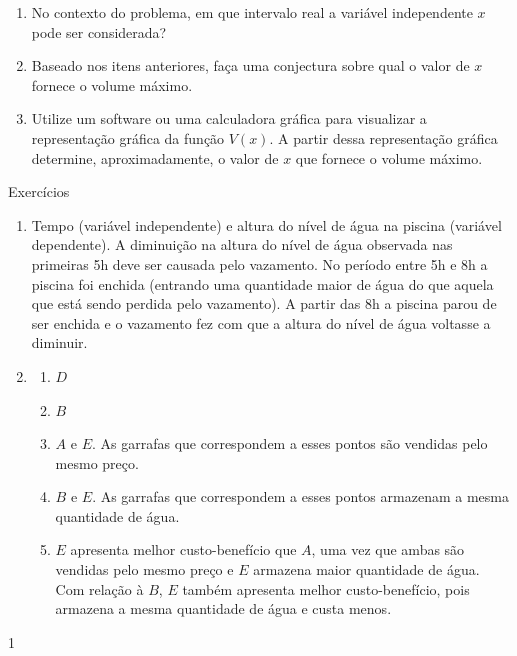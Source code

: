 \begin{project}
\begin{enumerate}
\item {} 
No contexto do problema, em que intervalo real a variável independente \(x\) pode ser considerada?

\item {} 
Baseado nos itens anteriores, faça uma conjectura sobre qual o valor de \(x\) fornece o volume máximo.

\item {} 
Utilize um software ou uma calculadora gráfica para visualizar a representação gráfica da função \(V(x)\). A partir dessa representação gráfica determine, aproximadamente, o valor de \(x\) que fornece o volume máximo.

\end{enumerate}
\end{project}

\exercise

\begin{answer}{Exercícios}
{\exerciselist
  \begin{enumerate}
  \item Tempo (variável independente) e altura do nível de água na piscina (variável dependente). A diminuição na altura do nível de água observada nas primeiras 5h deve ser causada pelo vazamento. No período entre 5h e 8h a piscina foi enchida (entrando uma quantidade maior de água do que aquela que está sendo perdida pelo vazamento). A partir das 8h a piscina parou de ser enchida e o vazamento fez com que a altura do nível de água voltasse a diminuir.

  \item
  \begin{enumerate}
  \item $D$
  \item $B$
  \item $A$ e $E$. As garrafas que correspondem a esses pontos são vendidas pelo mesmo preço.
  \item $B$ e $E$. As garrafas que correspondem a esses pontos armazenam a mesma quantidade de água.
  \item $E$ apresenta melhor custo-benefício que $A$, uma vez que ambas são vendidas pelo mesmo preço e $E$ armazena maior quantidade de água. Com relação à $B$, $E$ também apresenta melhor custo-benefício, pois armazena a mesma quantidade de água e custa menos.

  \end{enumerate}
  \end{enumerate}
}{1}
\end{answer}


